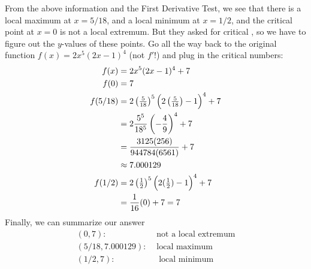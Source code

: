\documentclass[oneside]{book}
\newcommand{\BigParens}[1]
{\left(\raisebox{0in}[1.25\height]{$#1$}\right)}
\theoremstyle{definition}
\theoremstyle{solution}
\newtheorem*{solution}{Solution}
\newenvironment{solution}{\vspace{2in}\comment}{\endcomment}
\begin{document}
\begin{solution}
\begin{center}
\end{center}

From the above information and the First Derivative Test, we see that
there is a local maximum at $x = 5/18$, and a local minimum at
$x = 1/2$, and the critical point at $x = 0$ is not a local extremum.
But they asked for critical , so we have to figure out
the $y$-values of these points.  Go all the way back to the original
function $f(x)=2x^5(2x-1)^4$ (not $f'$!) and plug in the critical
numbers:
  \begin{align*}
    f(x) &= 2x^5(2x-1)^4 + 7\\
    f(0) &= 7\\
    f(5/18) & = 2\left(\tfrac{5}{18}\right)^5 \BigParens{2\left(\tfrac{5}{18}\right) - 1}^4 + 7\\
         & = 2\frac{5^5}{18^5}\left(-\frac{4}{9}\right)^4 + 7 \\
         & = \frac{3125(256)}{944784(6561)} + 7\\
         & \approx 7.000129\\
    f(1/2) & = 2\left(\tfrac{1}{2}\right)^5\BigParens{2(\tfrac{1}{2}) - 1}^4 + 7 \\
         & = \frac{1}{16}(0) + 7 =  7\\
  \end{align*}
Finally, we can summarize our answer
\begin{align*}
  (0, 7): & \text{ not a local extremum}\\
  (5/18, 7.000129):& \text{ local maximum}\\
  (1/2, 7):& \; \text{ local minimum}
\end{align*}
\end{solution}
  
\end{document}
